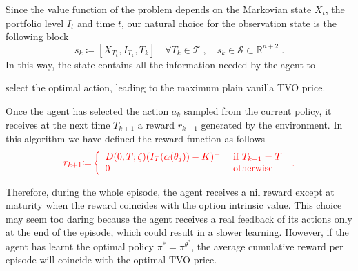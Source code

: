 \documentclass[runningheads]{m2ef}
\newcommand\soutpars[1]{\let\helpcmd\sout\parhelp#1\par\relax\relax}
\newcommand{\change}[1]{{\color{red} {#1}}}%
\newcommand{\remove}[1]{{\color{red} \soutpars{{#1}}}}%
\begin{document}
Since the value function of the problem depends on the Markovian state $X_t$, the portfolio level $I_t$ and time $t$, our natural choice for the observation state is the following block
\begin{equation}
 	s_{k} \coloneqq \left[X_{T_k}, I_{T_k}, T_k \right] \quad \forall T_k \in \mathcal{T} \; , \quad s_k \in \mathcal{S} \subset \mathbb{R}^{n+2} \; .
\label{eq:state}\end{equation}
In this way, the state contains all the information needed by the agent to \remove{take an} \change{select the} optimal action, leading to the maximum plain vanilla TVO price. 

\change{Once the agent has selected the action $a_k$ sampled from the current policy, it receives at the next time $T_{k+1}$ a reward $r_{k+1}$ generated by the environment. In this algorithm we have defined the reward function as follows}
 \begin{equation}
 	\change{r_{k+1}\change{\coloneqq}\left\{\begin{array}{ll}
 		 D(0,T;\zeta)(I_T(\alpha(\theta_j)) - K)^+ & \text { if } T_{k+1} = T \\
 		0 & \text { otherwise }
 	\end{array}\right.
 \label{eq:reward1} \; .} \end{equation}

 \change{Therefore, during the whole episode, the agent receives a nil reward except at maturity when the reward coincides with the option intrinsic value. This choice may seem too daring because the agent receives a real feedback of its actions only at the end of the episode, which could result in a slower learning. However, if the agent has learnt the optimal policy $\pi^* = \pi^{\theta^*}$, the average cumulative reward per episode will coincide with the optimal TVO price.}
\end{document}
